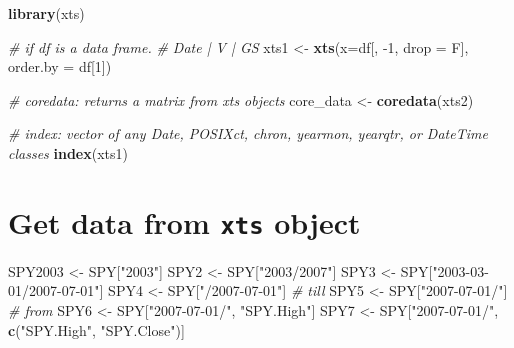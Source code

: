 \documentclass[]{article}
\newenvironment{Shaded}{\begin{snugshade}}{\end{snugshade}}
\newcommand{\CommentTok}[1]{\textcolor[rgb]{0.56,0.35,0.01}{\textit{#1}}}
\newcommand{\DataTypeTok}[1]{\textcolor[rgb]{0.13,0.29,0.53}{#1}}
\newcommand{\DecValTok}[1]{\textcolor[rgb]{0.00,0.00,0.81}{#1}}
\newcommand{\KeywordTok}[1]{\textcolor[rgb]{0.13,0.29,0.53}{\textbf{#1}}}
\newcommand{\NormalTok}[1]{#1}
\newcommand{\StringTok}[1]{\textcolor[rgb]{0.31,0.60,0.02}{#1}}
\begin{document}
\begin{Shaded}
\begin{Highlighting}[]
\KeywordTok{library}\NormalTok{(xts)}

\CommentTok{# if df is a data frame.}
\CommentTok{# Date | V | GS}
\NormalTok{xts1 <-}\StringTok{ }\KeywordTok{xts}\NormalTok{(}\DataTypeTok{x=}\NormalTok{df[, }\DecValTok{-1}\NormalTok{, }\DataTypeTok{drop =}\NormalTok{ F], }\DataTypeTok{order.by =}\NormalTok{ df[}\DecValTok{1}\NormalTok{])}

\CommentTok{# coredata: returns a matrix from xts objects}
\NormalTok{core_data <-}\StringTok{ }\KeywordTok{coredata}\NormalTok{(xts2)}

\CommentTok{# index: vector of any Date, POSIXct, chron, yearmon, yearqtr, or DateTime classes}
\KeywordTok{index}\NormalTok{(xts1)}
\end{Highlighting}
\end{Shaded}

\hypertarget{get-data-from-xts-object}{%
\section{\texorpdfstring{Get data from \texttt{xts}
object}{Get data from xts object}}\label{get-data-from-xts-object}}

\begin{Shaded}
\end{Shaded}

\begin{Shaded}
\begin{Highlighting}[]
\NormalTok{SPY2003 <-}\StringTok{ }\NormalTok{SPY[}\StringTok{"2003"}\NormalTok{]}
\NormalTok{SPY2 <-}\StringTok{ }\NormalTok{SPY[}\StringTok{"2003/2007"}\NormalTok{]}
\NormalTok{SPY3 <-}\StringTok{ }\NormalTok{SPY[}\StringTok{"2003-03-01/2007-07-01"}\NormalTok{]}
\NormalTok{SPY4 <-}\StringTok{ }\NormalTok{SPY[}\StringTok{"/2007-07-01"}\NormalTok{] }\CommentTok{# till }
\NormalTok{SPY5 <-}\StringTok{ }\NormalTok{SPY[}\StringTok{"2007-07-01/"}\NormalTok{] }\CommentTok{# from}
\NormalTok{SPY6 <-}\StringTok{ }\NormalTok{SPY[}\StringTok{"2007-07-01/"}\NormalTok{, }\StringTok{"SPY.High"}\NormalTok{]}
\NormalTok{SPY7 <-}\StringTok{ }\NormalTok{SPY[}\StringTok{"2007-07-01/"}\NormalTok{, }\KeywordTok{c}\NormalTok{(}\StringTok{"SPY.High"}\NormalTok{, }\StringTok{"SPY.Close"}\NormalTok{)]}
\end{Highlighting}
\end{Shaded}
\end{document}
